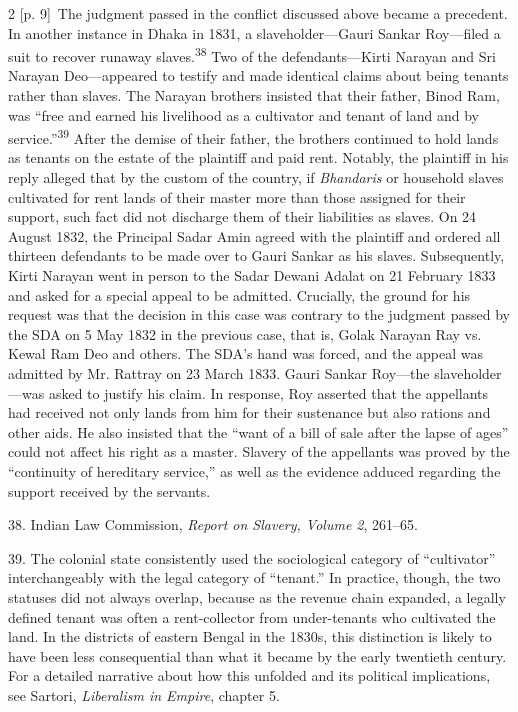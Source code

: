 \documentclass[10pt,a4paper]{article}
\begin{document}
\begin{paracol}{2}
{\scriptsize\color{gray} [p. 9]}\ The judgment passed in the conflict discussed above became a precedent. In another instance in Dhaka in 1831, a slaveholder—Gauri Sankar Roy—filed a suit to recover runaway slaves.\nobreak\textsuperscript{38} Two of the defendants—Kirti Narayan and Sri Narayan Deo—appeared to testify and made identical claims about being tenants rather than slaves. The Narayan brothers insisted that their father, Binod Ram, was “free and earned his livelihood as a cultivator and tenant of land and by service.”\nobreak\textsuperscript{39} After the demise of their father, the brothers continued to hold lands as tenants on the estate of the plaintiff and paid rent. Notably, the plaintiff in his reply alleged that by the custom of the country, if \textit{Bhandaris} or household slaves cultivated for rent lands of their master more than those assigned for their support, such fact did not discharge them of their liabilities as slaves. On 24 August 1832, the Principal Sadar Amin agreed with the plaintiff and ordered all thirteen defendants to be made over to Gauri Sankar as his slaves. Subsequently, Kirti Narayan went in person to the Sadar Dewani Adalat on 21 February 1833 and asked for a special appeal to be admitted. Crucially, the ground for his request was that the decision in this case was contrary to the judgment passed by the SDA on 5 May 1832 in the previous case, that is, Golak Narayan Ray vs. Kewal Ram Deo and others. The SDA’s hand was forced, and the appeal was admitted by Mr. Rattray on 23 March 1833. Gauri Sankar Roy—the slaveholder—was asked to justify his claim. In response, Roy asserted that the appellants had received not only lands from him for their sustenance but also rations and other aids. He also insisted that the “want of a bill of sale after the lapse of ages” could not affect his right as a master. Slavery of the appellants was proved by the “continuity of hereditary service,” as well as the evidence adduced regarding the support received by the servants.\par{\small 38. Indian Law Commission, \textit{Report on Slavery, Volume 2}, 261–65.\par}{\small 39. The colonial state consistently used the sociological category of “cultivator” interchangeably with the legal category of “tenant.” In practice, though, the two statuses did not always overlap, because as the revenue chain expanded, a legally defined tenant was often a rent-collector from under-tenants who cultivated the land. In the districts of eastern Bengal in the 1830s, this distinction is likely to have been less consequential than what it became by the early twentieth century. For a detailed narrative about how this unfolded and its political implications, see Sartori, \textit{Liberalism in Empire}, chapter 5.\par}

\end{paracol}
\end{document}
